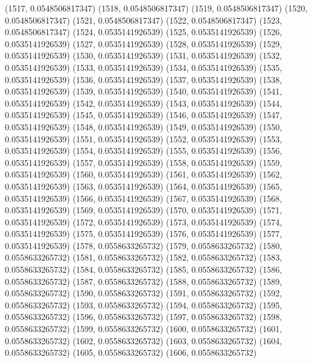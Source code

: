 {					(1517, 0.0548506817347)
					(1518, 0.0548506817347)
					(1519, 0.0548506817347)
					(1520, 0.0548506817347)
					(1521, 0.0548506817347)
					(1522, 0.0548506817347)
					(1523, 0.0548506817347)
					(1524, 0.0535141926539)
					(1525, 0.0535141926539)
					(1526, 0.0535141926539)
					(1527, 0.0535141926539)
					(1528, 0.0535141926539)
					(1529, 0.0535141926539)
					(1530, 0.0535141926539)
					(1531, 0.0535141926539)
					(1532, 0.0535141926539)
					(1533, 0.0535141926539)
					(1534, 0.0535141926539)
					(1535, 0.0535141926539)
					(1536, 0.0535141926539)
					(1537, 0.0535141926539)
					(1538, 0.0535141926539)
					(1539, 0.0535141926539)
					(1540, 0.0535141926539)
					(1541, 0.0535141926539)
					(1542, 0.0535141926539)
					(1543, 0.0535141926539)
					(1544, 0.0535141926539)
					(1545, 0.0535141926539)
					(1546, 0.0535141926539)
					(1547, 0.0535141926539)
					(1548, 0.0535141926539)
					(1549, 0.0535141926539)
					(1550, 0.0535141926539)
					(1551, 0.0535141926539)
					(1552, 0.0535141926539)
					(1553, 0.0535141926539)
					(1554, 0.0535141926539)
					(1555, 0.0535141926539)
					(1556, 0.0535141926539)
					(1557, 0.0535141926539)
					(1558, 0.0535141926539)
					(1559, 0.0535141926539)
					(1560, 0.0535141926539)
					(1561, 0.0535141926539)
					(1562, 0.0535141926539)
					(1563, 0.0535141926539)
					(1564, 0.0535141926539)
					(1565, 0.0535141926539)
					(1566, 0.0535141926539)
					(1567, 0.0535141926539)
					(1568, 0.0535141926539)
					(1569, 0.0535141926539)
					(1570, 0.0535141926539)
					(1571, 0.0535141926539)
					(1572, 0.0535141926539)
					(1573, 0.0535141926539)
					(1574, 0.0535141926539)
					(1575, 0.0535141926539)
					(1576, 0.0535141926539)
					(1577, 0.0535141926539)
					(1578, 0.0558633265732)
					(1579, 0.0558633265732)
					(1580, 0.0558633265732)
					(1581, 0.0558633265732)
					(1582, 0.0558633265732)
					(1583, 0.0558633265732)
					(1584, 0.0558633265732)
					(1585, 0.0558633265732)
					(1586, 0.0558633265732)
					(1587, 0.0558633265732)
					(1588, 0.0558633265732)
					(1589, 0.0558633265732)
					(1590, 0.0558633265732)
					(1591, 0.0558633265732)
					(1592, 0.0558633265732)
					(1593, 0.0558633265732)
					(1594, 0.0558633265732)
					(1595, 0.0558633265732)
					(1596, 0.0558633265732)
					(1597, 0.0558633265732)
					(1598, 0.0558633265732)
					(1599, 0.0558633265732)
					(1600, 0.0558633265732)
					(1601, 0.0558633265732)
					(1602, 0.0558633265732)
					(1603, 0.0558633265732)
					(1604, 0.0558633265732)
					(1605, 0.0558633265732)
					(1606, 0.0558633265732)
}
